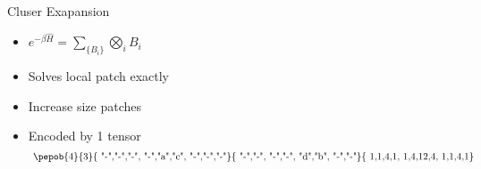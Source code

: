 \begin{frame}{Cluser Exapansion}
\begin{minipage}{0.5\textwidth}
{}
    \end{minipage}
    \begin{minipage}{0.49\textwidth}

         {

            \begin{itemize}
                \item $ e^{-\beta \hat{H}} = \sum_{ \{B_i\} } \bigotimes_i B_i  $
                \item Solves local patch exactly
                \item Increase size patches
                \item Encoded by 1 tensor
                      \begin{equation}
                          \vcenter{ \hbox{ \pepob{4}{3}{{
                                              "-","-","-",
                                              "-","a","c",
                                              "-","-","-"}}{{
                                              "-","-",
                                              "-","-",
                                              "d","b",
                                              "-","-"}}{{
                                              1,1,4,1,
                                              1,4,12,4,
                                              1,1,4,1}} }}
                      \end{equation}

            \end{itemize}

}
\end{minipage}
\end{frame}
